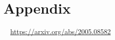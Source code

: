 \documentclass[a4j,12pt,dvipdfmx]{jarticle}
\title{}
\author{}
\date{}
\begin{document}
\maketitle

\begin{comment}

\section{}
\begin{figure}[H]
    \begin{center}
        \texttt{[image: ]}
        \caption{}
    \end{center}
\end{figure}

\begin{quote}
    \begin{itemize}
        \item 
    \end{itemize}
\end{quote}

\begin{align}
    & = 
    & =
\end{align}

\end{comment}

\section{}


\subsection{}


\section{Appendix}


\newpage
\begin{thebibliography}{H}
\bibitem{}　\url{https://arxiv.org/abs/2005.08582}
\end{thebibliography}
\end{document}
